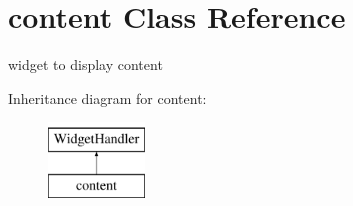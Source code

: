 \hypertarget{classcontent}{}\section{content Class Reference}
\label{classcontent}


widget to display content  


Inheritance diagram for content\+:\begin{figure}[H]
\begin{center}
\leavevmode
\includegraphics[height=2.000000cm]{classcontent}
\end{center}
\end{figure}
